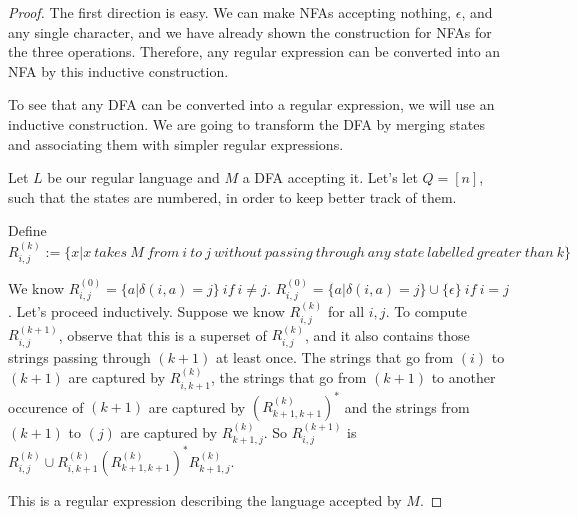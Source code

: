 \begin{proof}
	
	The first direction is easy.  We can make NFAs accepting nothing, $\epsilon$, and any single character, and we have already shown the construction for NFAs for the three operations.  Therefore, any regular expression can be converted into an NFA by this inductive construction.
	
	To see that any DFA can be converted into a regular expression, we will use an inductive construction.  We are going to transform the DFA by merging states and associating them with simpler regular expressions.
	
	Let $L$ be our regular language and $M$ a DFA accepting it.  Let's let $Q=[n]$, such that the states are numbered, in order to keep better track of them.
	
	Define $R_{i,j}^{(k)}:=\{x|x \ takes \ M \ from \ i \ to \ j\ without\ passing \ through\ any \ state\ labelled \ greater \ than \ k \}$
	
	We know $R^{(0)}_{i,j} = \{a|\delta(i,a) = j\} \ if \ i\neq j$.  $R^{(0)}_{i,j} = \{a|\delta(i,a) = j\}\cup\{\epsilon\} \ if \ i= j$.  Let's proceed inductively.  Suppose we know $R_{i,j}^{(k)}$ for all $i,j$.  To compute $R_{i,j}^{(k+1)}$, observe that this is a superset of $R_{i,j}^{(k)}$, and it also contains those strings passing through $(k+1)$ at least once.  The strings that go from $(i)$ to $(k+1)$ are captured by $R_{i,k+1}^{(k)}$, the strings that go from $(k+1)$ to another occurence of $(k+1)$ are captured by $(R_{k+1,k+1}^{(k)})^*$ and the strings from $(k+1)$ to $(j)$ are captured by $R_{k+1,j}^{(k)}$.  So $R_{i,j}^{(k+1)}$ is  $R_{i,j}^{(k)} \cup 
	R_{i,k+1}^{(k)} (R_{k+1,k+1}^{(k)})^*R_{k+1,j}^{(k)}$.
	
	This is a regular expression describing the language accepted by $M$.


\end{proof}













